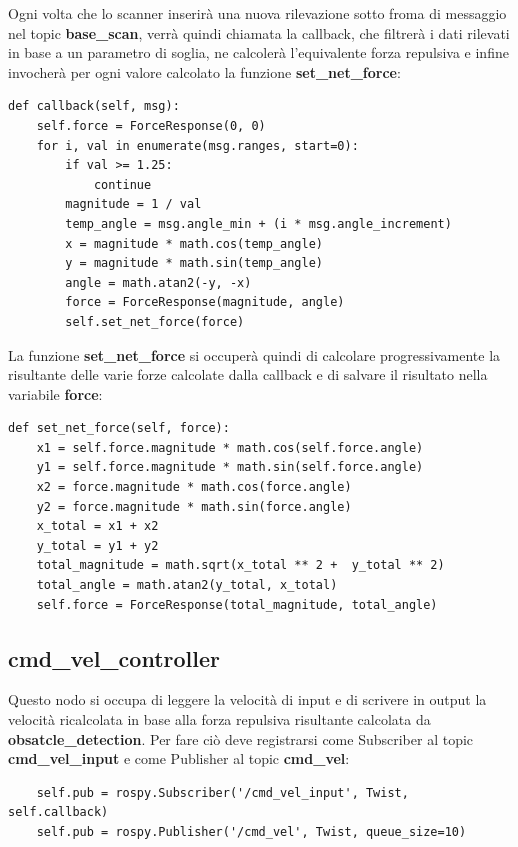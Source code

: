 \documentclass[Lau, binding=0.6cm, oneside]{sapthesis}
\begin{document}
Ogni volta che lo scanner inserirà una nuova rilevazione sotto froma di messaggio nel topic \textbf{base\_scan}, verrà quindi chiamata la callback, che filtrerà i dati rilevati in base a un parametro di soglia, ne calcolerà l'equivalente forza repulsiva e infine invocherà per ogni valore calcolato la funzione \textbf{set\_net\_force}:

\begin{lstlisting}
def callback(self, msg):
    self.force = ForceResponse(0, 0)
    for i, val in enumerate(msg.ranges, start=0):
        if val >= 1.25:
            continue
        magnitude = 1 / val
        temp_angle = msg.angle_min + (i * msg.angle_increment)
        x = magnitude * math.cos(temp_angle)
        y = magnitude * math.sin(temp_angle)
        angle = math.atan2(-y, -x)
        force = ForceResponse(magnitude, angle)
        self.set_net_force(force)
\end{lstlisting}

La funzione \textbf{set\_net\_force} si occuperà quindi di calcolare progressivamente la risultante delle varie forze calcolate dalla callback e di salvare il risultato nella variabile \textbf{force}:

\begin{lstlisting}
def set_net_force(self, force):
    x1 = self.force.magnitude * math.cos(self.force.angle)
    y1 = self.force.magnitude * math.sin(self.force.angle)
    x2 = force.magnitude * math.cos(force.angle)
    y2 = force.magnitude * math.sin(force.angle)
    x_total = x1 + x2
    y_total = y1 + y2
    total_magnitude = math.sqrt(x_total ** 2 +  y_total ** 2)
    total_angle = math.atan2(y_total, x_total)
    self.force = ForceResponse(total_magnitude, total_angle)
\end{lstlisting}

\subsection{cmd\_vel\_controller}
Questo nodo si occupa di leggere la velocità di input e di scrivere in output la velocità ricalcolata in base alla forza repulsiva risultante calcolata da \textbf{obsatcle\_detection}.
Per fare ciò deve registrarsi come Subscriber al topic \textbf{cmd\_vel\_input} e come Publisher al topic \textbf{cmd\_vel}:

\begin{lstlisting}
    self.pub = rospy.Subscriber('/cmd_vel_input', Twist, self.callback)
    self.pub = rospy.Publisher('/cmd_vel', Twist, queue_size=10)
\end{lstlisting}
\end{document}
